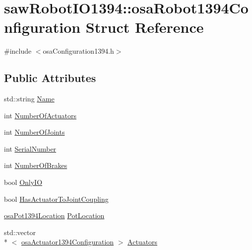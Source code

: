 \hypertarget{structsaw_robot_i_o1394_1_1osa_robot1394_configuration}{\section{saw\-Robot\-I\-O1394\-:\-:osa\-Robot1394\-Configuration Struct Reference}
\label{structsaw_robot_i_o1394_1_1osa_robot1394_configuration}
}


{\ttfamily \#include $<$osa\-Configuration1394.\-h$>$}

\subsection*{Public Attributes}
\begin{DoxyCompactItemize}
\item 
std\-::string \hyperlink{structsaw_robot_i_o1394_1_1osa_robot1394_configuration_ad6b0699fb042c74c6b8fad95e2759758}{Name}
\item 
int \hyperlink{structsaw_robot_i_o1394_1_1osa_robot1394_configuration_a05c7f51c9d890b9e0f11cec350bf985d}{Number\-Of\-Actuators}
\item 
int \hyperlink{structsaw_robot_i_o1394_1_1osa_robot1394_configuration_a8f20205cf84b097ff516024f84539171}{Number\-Of\-Joints}
\item 
int \hyperlink{structsaw_robot_i_o1394_1_1osa_robot1394_configuration_ac794d131a11c2e3dc453f5f753e564d3}{Serial\-Number}
\item 
int \hyperlink{structsaw_robot_i_o1394_1_1osa_robot1394_configuration_a17d68dc07c390a7085ad680422df32bb}{Number\-Of\-Brakes}
\item 
bool \hyperlink{structsaw_robot_i_o1394_1_1osa_robot1394_configuration_adb157eac1f41c7fa79e17acce239cfad}{Only\-I\-O}
\item 
bool \hyperlink{structsaw_robot_i_o1394_1_1osa_robot1394_configuration_ad1fa7199924f9bb6b613e06aa4565548}{Has\-Actuator\-To\-Joint\-Coupling}
\item 
\hyperlink{namespacesaw_robot_i_o1394_a9d63d89648f679b6af5cf3f16576bde9}{osa\-Pot1394\-Location} \hyperlink{structsaw_robot_i_o1394_1_1osa_robot1394_configuration_a5b38595afbffebafba80e01c0bea9bac}{Pot\-Location}
\item 
std\-::vector\\*
$<$ \hyperlink{structsaw_robot_i_o1394_1_1osa_actuator1394_configuration}{osa\-Actuator1394\-Configuration} $>$ \hyperlink{structsaw_robot_i_o1394_1_1osa_robot1394_configuration_a1f32b7a5a19e4774370b591cb92d1650}{Actuators}

\end{DoxyCompactItemize}
